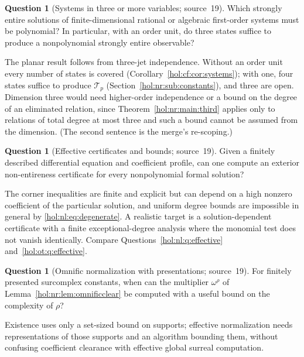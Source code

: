 \documentclass[11pt]{article}
\numberwithin{equation}{section}
\theoremstyle{definition}
\newtheorem{question}[theorem]{Question}
\theoremstyle{remark}
\begin{document}
\begin{question}[Systems in three or more variables; source~19]
\label{hol:nr:q:systems}
Which strongly entire solutions of finite-dimensional rational or algebraic
first-order systems must be polynomial? In particular, with an order unit, do
three states suffice to produce a nonpolynomial strongly entire observable?
\end{question}

The planar result follows from three-jet independence. Without an order unit
every number of states is covered (Corollary~\ref{hol:cf:cor:systems}); with
one, four states suffice to produce $\mathcal T_p$
(Section~\ref{hol:nr:sub:constants}), and three are open. Dimension three
would need higher-order independence or a bound on the degree of an
eliminated relation, since Theorem~\ref{hol:nr:main:third} applies only to
relations of total degree at most three and such a bound cannot be assumed
from the dimension. (The second sentence is the merge's re-scoping.)

\begin{question}[Effective certificates and bounds; source~19]
\label{hol:nr:q:certificates}
Given a finitely described differential equation and coefficient profile, can
one compute an exterior non-entireness certificate for every nonpolynomial
formal solution?
\end{question}

The corner inequalities are finite and explicit but can depend on a high
nonzero coefficient of the particular solution, and uniform degree bounds are
impossible in general by \eqref{hol:nl:eq:degenerate}. A realistic target is a
solution-dependent certificate with a finite exceptional-degree analysis
where the monomial test does not vanish identically. Compare
Questions~\ref{hol:nl:q:effective} and~\ref{hol:ot:q:effective}.

\begin{question}[Omnific normalization with presentations; source~19]
\label{hol:nr:q:omnific}
For finitely presented surcomplex constants, when can the multiplier
$\omega^\rho$ of Lemma~\ref{hol:nr:lem:omnificclear} be computed with a useful
bound on the complexity of $\rho$?
\end{question}

Existence uses only a set-sized bound on supports; effective normalization
needs representations of those supports and an algorithm bounding them,
without confusing coefficient clearance with effective global surreal
computation.
\end{document}
